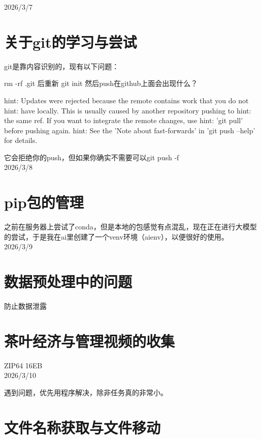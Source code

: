 \documentclass{ctexart}
\begin{document}
\pagestyle{plain}

2026/3/7

\section*{\normalfont 关于git的学习与尝试}

git是靠内容识别的，现有以下问题：
  
rm -rf .git 后重新 git init 然后push在github上面会出现什么？
  
hint: Updates were rejected because the remote contains work that you do not
hint: have locally. This is usually caused by another repository pushing to
hint: the same ref. If you want to integrate the remote changes, use
hint: 'git pull' before pushing again.
hint: See the 'Note about fast-forwards' in 'git push --help' for details.

它会拒绝你的push，但如果你确实不需要可以git push -f\\

2026/3/8

\section*{\normalfont pip包的管理}

之前在服务器上尝试了conda，但是本地的包感觉有点混乱，现在正在进行大模型的尝试，于是我在ai里创建了一个venv环境（aienv），以便很好的使用。\\

2026/3/9

\section*{\normalfont 数据预处理中的问题}

防止数据泄露


\section*{\normalfont 茶叶经济与管理视频的收集}

ZIP64 16EB\\

2026/3/10

遇到问题，优先用程序解决，除非任务真的非常小。

\section*{\normalfont 文件名称获取与文件移动}
\end{document}
